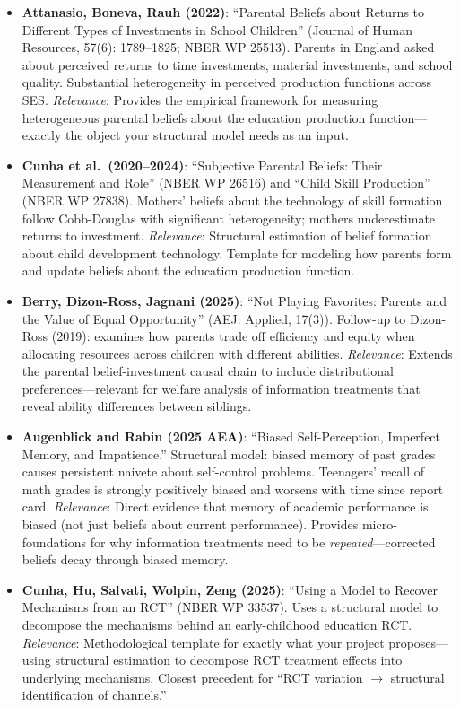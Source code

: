 \documentclass[11pt]{article}
\begin{document}
\begin{itemize}
  \item \textbf{Attanasio, Boneva, Rauh (2022)}: ``Parental Beliefs about Returns to Different Types of Investments in School Children'' (Journal of Human Resources, 57(6): 1789--1825; NBER WP 25513). Parents in England asked about perceived returns to time investments, material investments, and school quality. Substantial heterogeneity in perceived production functions across SES. \emph{Relevance}: Provides the empirical framework for measuring heterogeneous parental beliefs about the education production function---exactly the object your structural model needs as an input.

  \item \textbf{Cunha et al.\ (2020--2024)}: ``Subjective Parental Beliefs: Their Measurement and Role'' (NBER WP 26516) and ``Child Skill Production'' (NBER WP 27838). Mothers' beliefs about the technology of skill formation follow Cobb-Douglas with significant heterogeneity; mothers underestimate returns to investment. \emph{Relevance}: Structural estimation of belief formation about child development technology. Template for modeling how parents form and update beliefs about the education production function.

  \item \textbf{Berry, Dizon-Ross, Jagnani (2025)}: ``Not Playing Favorites: Parents and the Value of Equal Opportunity'' (AEJ: Applied, 17(3)). Follow-up to Dizon-Ross (2019): examines how parents trade off efficiency and equity when allocating resources across children with different abilities. \emph{Relevance}: Extends the parental belief-investment causal chain to include distributional preferences---relevant for welfare analysis of information treatments that reveal ability differences between siblings.

  \item \textbf{Augenblick and Rabin (2025 AEA)}: ``Biased Self-Perception, Imperfect Memory, and Impatience.'' Structural model: biased memory of past grades causes persistent naivete about self-control problems. Teenagers' recall of math grades is strongly positively biased and worsens with time since report card. \emph{Relevance}: Direct evidence that memory of academic performance is biased (not just beliefs about current performance). Provides micro-foundations for why information treatments need to be \emph{repeated}---corrected beliefs decay through biased memory.

  \item \textbf{Cunha, Hu, Salvati, Wolpin, Zeng (2025)}: ``Using a Model to Recover Mechanisms from an RCT'' (NBER WP 33537). Uses a structural model to decompose the mechanisms behind an early-childhood education RCT. \emph{Relevance}: Methodological template for exactly what your project proposes---using structural estimation to decompose RCT treatment effects into underlying mechanisms. Closest precedent for ``RCT variation $\to$ structural identification of channels.''
\end{itemize}
\end{document}
